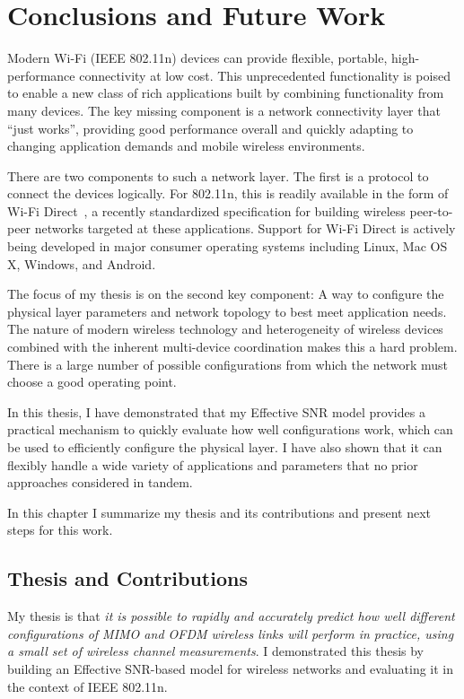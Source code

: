 \ifx\mainfile\undefined

\setcounter{chapter}{9} %
\fi

\cleardoublepage
\chapter{Conclusions and Future Work}
\label{chap:conclusion}

Modern Wi-Fi (IEEE 802.11n) devices can provide flexible, portable, high-performance connectivity at low cost. This unprecedented functionality is poised to enable a new class of rich applications built by combining functionality from many devices. The key missing component is a network connectivity layer that ``just works'', providing good performance overall and quickly adapting to changing application demands and mobile wireless environments.

There are two components to such a network layer. The first is a protocol to connect the devices logically. For 802.11n, this is readily available in the form of Wi-Fi Direct~\cite{wifi_direct}, a recently standardized specification for building wireless peer-to-peer networks targeted at these applications. Support for Wi-Fi Direct is actively being developed in major consumer operating systems including Linux, Mac OS X, Windows, and Android.

The focus of my thesis is on the second key component: A way to configure the physical layer parameters and network topology to best meet application needs. The nature of modern wireless technology and heterogeneity of wireless devices combined with the inherent multi-device coordination makes this a hard problem. There is a large number of possible configurations from which the network must choose a good operating point.

In this thesis, I have demonstrated that my Effective SNR model provides a practical mechanism to quickly evaluate how well configurations work, which can be used to efficiently configure the physical layer. I have also shown that it can flexibly handle a wide variety of applications and parameters that no prior approaches considered in tandem.

In this chapter I summarize my thesis and its contributions and present next steps for this work.

\section{Thesis and Contributions}
My thesis is that \emph{it is possible to rapidly and accurately predict how well different configurations of MIMO and OFDM wireless links will perform in practice, using a small set of wireless channel measurements}. I demonstrated this thesis by building an Effective SNR-based model for wireless networks and evaluating it in the context of IEEE 802.11n.

